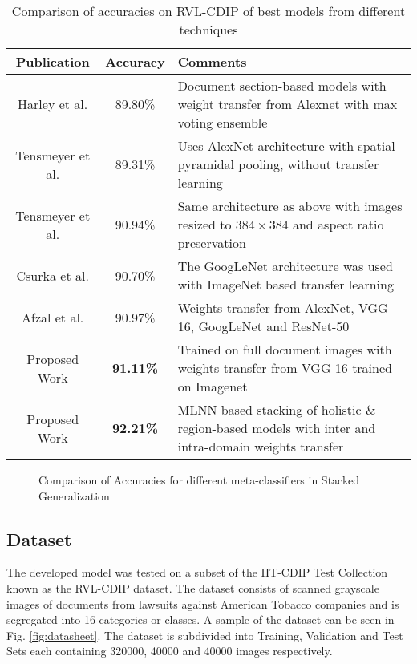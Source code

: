 \documentclass[10pt,conference,a4paper]{IEEEtran}
\begin{document}
\begin{table}[]
	\centering
	\caption{Comparison of accuracies on RVL-CDIP of best models from different techniques}
	\label{Tab:FinalComp}
	\begin{tabularx}{\columnwidth}{|c|c|m{}|}
		\hline
		\textbf{Publication} & \textbf{Accuracy} & \textbf{\hspace{0.16\columnwidth}Comments}\\
		\hline \hline
		Harley et al.\cite{harley2015evaluation}        & 89.80\%            & {Document section-based models with weight transfer from Alexnet with max voting ensemble \centering}\\
		\hline
		Tensmeyer et al.\cite{tensmeyer2017analysis}     & 89.31\%           & Uses AlexNet architecture with spatial pyramidal pooling, without transfer learning\\
		\hline		
		Tensmeyer et al.\cite{tensmeyer2017analysis}    & 90.94\%           & Same architecture as above with images resized to $384\times 384$ and aspect ratio preservation\\
		\hline
		Csurka et al. \cite{csurka2016right}        & 90.70\%           & The GoogLeNet architecture was used with ImageNet based transfer learning\\
		\hline
		Afzal et al. \cite{afzal2017cutting}        & 90.97\%           & Weights transfer from AlexNet, VGG-16, GoogLeNet and ResNet-50\\
		\hline		
		Proposed Work         & \textbf{91.11\%}           & Trained on full document images with weights transfer from VGG-16 trained on Imagenet\\
		\hline
		Proposed Work         & \textbf{92.21\%}           & MLNN based stacking of holistic \& region-based models with inter and intra-domain weights transfer\\
		\hline
	\end{tabularx}
\end{table}


\begin{figure}[t]
	\centering
	\caption{Comparison of Accuracies for different meta-classifiers in Stacked Generalization} \label{fig:stacking}
\end{figure}


\subsection{Dataset}
The developed model was tested on a subset of the IIT-CDIP Test Collection known as the RVL-CDIP dataset. The dataset consists of scanned grayscale images of documents from lawsuits against American Tobacco companies and is segregated into 16 categories or classes. A sample of the dataset can be seen in Fig. \ref{fig:datasheet}. The dataset is subdivided into Training, Validation and Test Sets each containing 320000, 40000 and 40000 images respectively.
\end{document}
